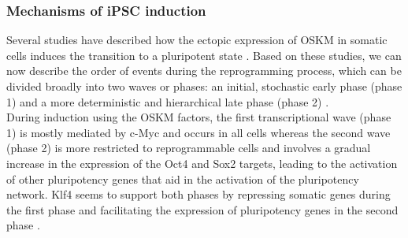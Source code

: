 


\subsubsection{Mechanisms of iPSC induction}


Several studies have described how the ectopic expression of OSKM in somatic cells induces the transition to a pluripotent state \cite{yamanaka2007strategies, brambrink2008sequential, stadtfeld2008induced, polo2012molecular, hansson2012highly, buganim2012single}. 
Based on these studies, we can now describe the order of events during the reprogramming process, which can be divided broadly into two waves or phases: an initial, stochastic early phase (phase 1) and a more deterministic and hierarchical late phase (phase 2) \cite{omole2018ten, takahashi2016decade, brouwer2016choices}.\\

During induction using the OSKM factors, the first transcriptional wave (phase 1) is mostly mediated by c-Myc and occurs in all cells whereas the second wave (phase 2) is more restricted to reprogrammable cells and involves a gradual increase in the expression of the Oct4 and Sox2 targets, leading to the activation of other pluripotency genes that aid in the activation of the pluripotency network. 
Klf4 seems to support both phases by repressing somatic genes during the first phase and facilitating the expression of pluripotency genes in the second phase \cite{buganim2013mechanisms}.\\

